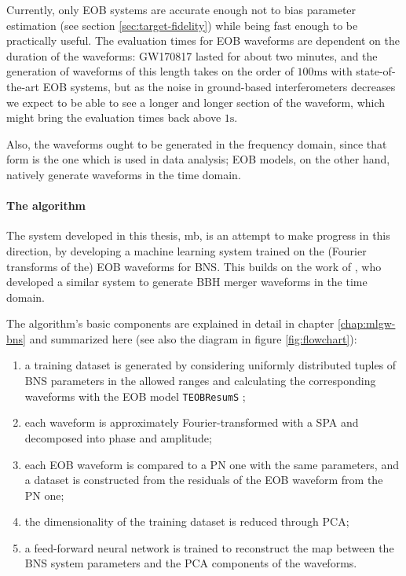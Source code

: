 \documentclass[main.tex]{subfiles}
\begin{document}
Currently, only \ac{EOB} systems are accurate enough not to bias parameter estimation (see section \ref{sec:target-fidelity}) while being fast enough to be practically useful.
The evaluation times for \ac{EOB} waveforms are dependent on the duration of the waveforms: GW170817 lasted for about two minutes, and the generation of waveforms of this length takes on the order of $100\text{ms}$ with state-of-the-art \ac{EOB} systems, but as the noise in ground-based interferometers decreases we expect to be able to see a longer and longer section of the waveform, which might bring the evaluation times back above $1\text{s}$.

Also, the waveforms ought to be generated in the frequency domain, since that form is the one which is used in data analysis;
EOB models, on the other hand, natively generate waveforms in the time domain. 

\paragraph{The algorithm}

The system developed in this thesis, \ac{mb}, is an attempt to make progress in this direction, by developing a machine learning system trained on the (Fourier transforms of the) \ac{EOB} waveforms for \ac{BNS}. 
This builds on the work of \textcite{schmidtMachineLearningGravitational2020}, who developed a similar system to generate \ac{BBH} merger waveforms in the time domain.

The algorithm's basic components are explained in detail in chapter \ref{chap:mlgw-bns} and summarized here (see also the diagram in figure \ref{fig:flowchart}):
\begin{enumerate}
    \item a training dataset is generated by considering uniformly distributed tuples of \ac{BNS} parameters in the allowed ranges and calculating the corresponding waveforms with the \ac{EOB} model \texttt{TEOBResumS} \cite[]{nagarTimedomainEffectiveonebodyGravitational2018};
    \item each waveform is approximately Fourier-transformed with a \ac{SPA} \cite[]{gambaFastFaithfulFrequencydomain2020} and decomposed into phase and amplitude;
    \item each \ac{EOB} waveform is compared to a \ac{PN} one with the same parameters, and a dataset is constructed from the residuals of the \ac{EOB} waveform from the \ac{PN} one;
    \item the dimensionality of the training dataset is reduced through \ac{PCA};
    \item a feed-forward neural network is trained to reconstruct the map between the \ac{BNS} system parameters and the \ac{PCA} components of the waveforms. 
\end{enumerate}
\end{document}
